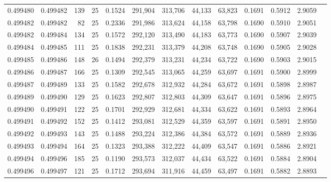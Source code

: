 \begin{tabular}{rrrrrrrrrrrrr}
0.499480 & 0.499482 & 139 &  25 &                                     0.1524 & 291,904 & 313,706 &  44,133 &  63,823 & 0.1691 & 0.5912 & 2.9059 \\
0.499482 & 0.499482 &  82 &  25 &                                     0.2336 & 291,986 & 313,624 &  44,158 &  63,798 & 0.1690 & 0.5910 & 2.9051 \\
0.499482 & 0.499484 & 134 &  25 &                                     0.1572 & 292,120 & 313,490 &  44,183 &  63,773 & 0.1690 & 0.5907 & 2.9039 \\
0.499484 & 0.499485 & 111 &  25 &                                     0.1838 & 292,231 & 313,379 &  44,208 &  63,748 & 0.1690 & 0.5905 & 2.9028 \\
0.499485 & 0.499486 & 148 &  26 &                                     0.1494 & 292,379 & 313,231 &  44,234 &  63,722 & 0.1690 & 0.5903 & 2.9015 \\
0.499486 & 0.499487 & 166 &  25 &                                     0.1309 & 292,545 & 313,065 &  44,259 &  63,697 & 0.1691 & 0.5900 & 2.8999 \\
0.499487 & 0.499489 & 133 &  25 &                                     0.1582 & 292,678 & 312,932 &  44,284 &  63,672 & 0.1691 & 0.5898 & 2.8987 \\
0.499489 & 0.499490 & 129 &  25 &                                     0.1623 & 292,807 & 312,803 &  44,309 &  63,647 & 0.1691 & 0.5896 & 2.8975 \\
0.499490 & 0.499491 & 122 &  25 &                                     0.1701 & 292,929 & 312,681 &  44,334 &  63,622 & 0.1691 & 0.5893 & 2.8964 \\
0.499491 & 0.499492 & 152 &  25 &                                     0.1412 & 293,081 & 312,529 &  44,359 &  63,597 & 0.1691 & 0.5891 & 2.8950 \\
0.499492 & 0.499493 & 143 &  25 &                                     0.1488 & 293,224 & 312,386 &  44,384 &  63,572 & 0.1691 & 0.5889 & 2.8936 \\
0.499493 & 0.499494 & 164 &  25 &                                     0.1323 & 293,388 & 312,222 &  44,409 &  63,547 & 0.1691 & 0.5886 & 2.8921 \\
0.499494 & 0.499496 & 185 &  25 &                                     0.1190 & 293,573 & 312,037 &  44,434 &  63,522 & 0.1691 & 0.5884 & 2.8904 \\
0.499496 & 0.499497 & 121 &  25 &                                     0.1712 & 293,694 & 311,916 &  44,459 &  63,497 & 0.1691 & 0.5882 & 2.8893 \\

\end{tabular}
